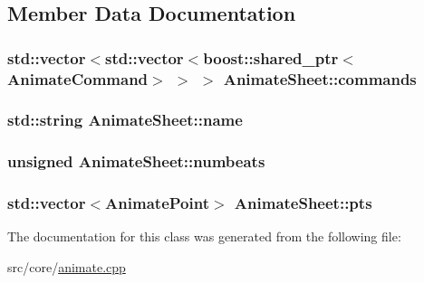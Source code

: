 \subsection{Member Data Documentation}
\hypertarget{a00008_a73fe68e5317b281633892b7d3adf8b99}{
\subsubsection[{commands}]{\setlength{\rightskip}{0pt plus 5cm}std\-::vector$<$std\-::vector$<$boost\-::shared\-\_\-ptr$<${\bf Animate\-Command}$>$ $>$ $>$ Animate\-Sheet\-::commands}}\label{a00008_a73fe68e5317b281633892b7d3adf8b99}
\hypertarget{a00008_a3d69624ad9735831c6e4d1fa30b5bc95}{
\subsubsection[{name}]{\setlength{\rightskip}{0pt plus 5cm}std\-::string Animate\-Sheet\-::name\hspace{0.3cm}{\ttfamily [private]}}}\label{a00008_a3d69624ad9735831c6e4d1fa30b5bc95}
\hypertarget{a00008_a2660ce9be9f921619852a825c66fecb2}{
\subsubsection[{numbeats}]{\setlength{\rightskip}{0pt plus 5cm}unsigned Animate\-Sheet\-::numbeats\hspace{0.3cm}{\ttfamily [private]}}}\label{a00008_a2660ce9be9f921619852a825c66fecb2}
\hypertarget{a00008_ab4b7ddaeddbd8a2abce467ffbfef1cd8}{
\subsubsection[{pts}]{\setlength{\rightskip}{0pt plus 5cm}std\-::vector$<${\bf Animate\-Point}$>$ Animate\-Sheet\-::pts}}\label{a00008_ab4b7ddaeddbd8a2abce467ffbfef1cd8}


The documentation for this class was generated from the following file\-:\begin{DoxyCompactItemize}
\item 
src/core/\hyperlink{a00194}{animate.\-cpp}\end{DoxyCompactItemize}
